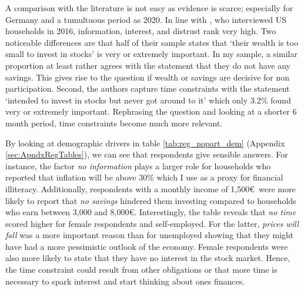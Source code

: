 \documentclass[ProjectABM]{subfiles}
\begin{document}


A comparison with the literature is not easy as evidence is scarce; especially for Germany and a tumultuous period as 2020. In line with \cite{choi_2020}, who interviewed US households in 2016, information, interest, and distrust rank very high. Two noticeable differences are that half of their sample states that `their wealth is too small to invest in stocks' is very or extremely important. In my sample, a similar proportion at least rather agrees with the statement that they do not have any savings. This gives rise to the question if wealth or savings are decisive for non participation. Second, the authors capture time constraints with the statement `intended to invest in stocks but never got around to it' which only 3.2\% found very or extremely important. Rephrasing the question and looking at a shorter 6 month period, time constraints become much more relevant.


By looking at demographic drivers in table \ref{tab:reg_nopart_dem} (Appendix \ref{sec:ApndxRegTables}), we can see that respondents give sensible answers. For instance, the factor \textit{no information} plays a larger role for households who reported that inflation will be above 30\% which I use as a proxy for financial illiteracy. Additionally, respondents with a monthly income of 1,500\euro\ were more likely to report that \textit{no savings} hindered them investing compared to households who earn between 3,000 and 8,000\euro. Interestingly, the table reveals that \textit{no time} scored higher for female respondents and self-employed. For the latter, \textit{prices will fall} was a more important reason than for unemployed showing that they might have had a more pessimistic outlook of the economy. Female respondents were also more likely to state that they have no interest in the stock market. Hence, the time constraint could result from other obligations or that more time is necessary to spark interest and start thinking about ones finances.


\end{document}

